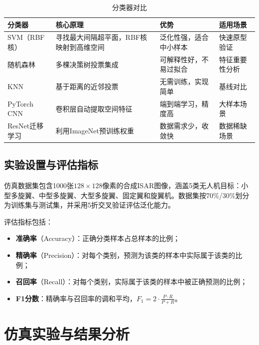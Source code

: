 \documentclass[12pt, a4paper]{article}
\begin{document}
\begin{table}[H]
\centering
\begin{tabularx}{\textwidth}{lLLL}
\toprule
{}\color{white}\bfseries 分类器 &
  \color{white}\bfseries 核心原理 &
  \color{white}\bfseries 优势 &
  \color{white}\bfseries 适用场景 \\
\midrule
SVM（RBF核） & 寻找最大间隔超平面，RBF核映射到高维空间 & 泛化性强，适合中小样本 & 快速原型验证 \\
随机森林 & 多棵决策树投票集成 & 可解释性好，不易过拟合 & 特征重要性分析 \\
KNN & 基于距离的近邻投票 & 无需训练，实现简单 & 基线对比 \\
PyTorch CNN & 卷积层自动提取空间特征 & 端到端学习，精度高 & 大样本场景 \\
ResNet迁移学习 & 利用ImageNet预训练权重 & 数据需求少，收敛快 & 数据稀缺场景 \\
\bottomrule
\end{tabularx}
\caption{分类器对比}
\label{tab:classifiers}
\end{table}

\subsection{实验设置与评估指标}

仿真数据集包含1000张$128\times128$像素的合成ISAR图像，涵盖5类无人机目标：小型多旋翼、中型多旋翼、大型多旋翼、固定翼和旋翼机。数据集按70\%/30\%划分为训练集与测试集，并采用5折交叉验证评估泛化能力。

评估指标包括：
\begin{itemize}
  \item \textbf{准确率}（Accuracy）：正确分类样本占总样本的比例；
  \item \textbf{精确率}（Precision）：对每个类别，预测为该类的样本中实际属于该类的比例；
  \item \textbf{召回率}（Recall）：对每个类别，实际属于该类的样本中被正确预测的比例；
  \item \textbf{F1分数}：精确率与召回率的调和平均，$F_1 = 2 \cdot \frac{P \cdot R}{P + R}$。
\end{itemize}

\section{仿真实验与结果分析}
\label{sec:experiments}
\end{document}
